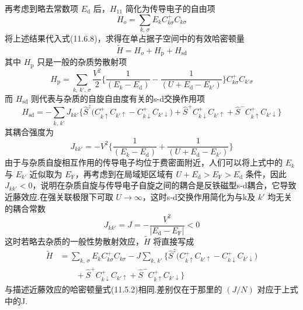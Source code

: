 再考虑到略去常数项 $E_{\mathrm{d}}$ 后，$H_{11}$ 简化为传导电子的自由项
\begin{equation}
  H_{o}=\sum_{k,\,\sigma}E_{k}C^{+}_{k\sigma}C_{k\sigma}
\end{equation}
将上述结果代入式(11.6.8)，求得在单占据子空间中的有效哈密顿量
\begin{equation}
  \widetilde{H}=H_{o}+H_{\mathrm{p}}+H_{\mathrm{sd}}
\end{equation}
其中 $H_{\mathrm{p}}$ 只是一般的杂质势散射项
\begin{equation}
  H_{\mathrm{p}}=\sum_{k,\,k',\,\sigma}\frac{V^{2}}{2}
  \biggl\{\frac{1}{(E_{k}-E_{\mathrm{d}})}
  -\frac{1}{(U+E_{\mathrm{d}}-E_{k'})}\biggr\}
  C^{+}_{k\sigma}C_{k'\sigma}
\end{equation}
而 $H_{\mathrm{sd}}$ 则代表与杂质的自旋自由度有关的s-d交换作用项
\begin{equation}
  H_{\mathrm{sd}}=-\sum_{k,\,k'}J_{kk'}
  \bigl\{\hat{S}^{z}\bigl(C^{+}_{k\uparrow}C_{k'\uparrow}
  -C^{+}_{k\downarrow}C_{k'\downarrow}\bigr)
  +\hat{S}^{+}C^{+}_{k\downarrow}C_{k'\uparrow}
  +\hat{S}^{-}C^{+}_{k\uparrow}C_{k'\downarrow}\bigr\}
\end{equation}
其耦合强度为
\begin{equation}
  J_{kk'}=-V^{2}\biggl\{\frac{1}{(E_{k}-E_{\mathrm{d}})}
  +\frac{1}{(U+E_{\mathrm{d}}-E_{k'})}\biggr\}
\end{equation}
由于与杂质自旋相互作用的传导电子均位于费密面附近，人们可以将上式中的 $E_{k}$ 与 $E_{k'}$ 近似取为 $E_{\mathrm{F}}$，再考虑到在局域矩区域有 $U+E_{\mathrm{d}}>E_{\mathrm{F}}>E_{\mathrm{d}}$ 条件，因此 $J_{kk'}<0$，说明在杂质自旋与传导电子自旋之间的耦合是反铁磁型s-d耦合，它导致近藤效应.在强关联极限下可取 $U\to\infty$，这时s-d交换作用简化为与k及 $k'$ 均无关的耦合常数
\begin{equation}
  J_{kk'}=J=-\frac{V^{2}}{|E_{\mathrm{d}}-E_{\mathrm{F}}|}<0
\end{equation}
这时若略去杂质的一般性势散射效应，$\widetilde{H}$ 将直接写成
\begin{equation}
\begin{aligned}
  \widetilde{H}&=\sum_{k,\,\sigma}E_{k}C^{+}_{k\sigma}C_{k\sigma}
  -J\sum_{k,\,k'}\bigl\{\hat{S}^{z}\bigl(C^{+}_{k\uparrow}C_{k'\uparrow}
  -C^{+}_{k\downarrow}C_{k'\downarrow}\bigr)\\
  &\qquad+\hat{S}^{+}C^{+}_{k\downarrow}C_{k'\uparrow}
  +\hat{S}^{-}C^{+}_{k\uparrow}C_{k'\downarrow}\bigr\}
\end{aligned}
\end{equation}
与描述近藤效应的哈密顿量式(11.5.2)相同.差别仅在于那里的 $(J/N)$ 对应于上式中的J.

